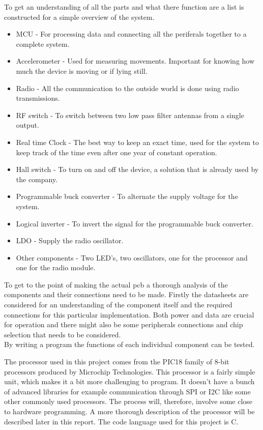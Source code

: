 To get an understanding of all the parts and what there function are a list is constructed for a simple overview of the system.

\begin{itemize}[noitemsep]
	\item MCU - For processing data and connecting all the periferals together to a complete system.
	\item Accelerometer - Used for measuring movements. Important for knowing how much the device is moving or if lying still.
	\item Radio - All the communication to the outside world is done using radio transmissions. 
	\item RF switch - To switch between two low pass filter antennas from a single output.
	\item Real time Clock - The best way to keep an exact time, used for the system to keep track of the time even after one year of constant operation. 
	\item Hall switch - To turn on and off the device, a solution that is already used by the company.
	\item Programmable buck converter - To alternate the supply voltage for the system. 
	\item Logical inverter - To invert the signal for the programmable buck converter.
	\item LDO - Supply the radio oscillator.
	\item Other components - Two LED's, two oscillators, one for the processor and one for the radio module.
\end{itemize}


To get to the point of making the actual \gls{pcb} a thorough analysis of the components and their connections need to be made. Firstly the datasheets are considered for an understanding of the component itself and the required connections for this particular implementation. Both power and data are crucial for operation and there might also be some peripherals connections and chip selection that needs to be considered. \\
By writing a program the functions of each individual component can be tested. 

The processor used in this project comes from the PIC18 family of 8-bit processors produced by Microchip Technologies. This processor is a fairly simple unit, which makes it a bit more challenging to program. It doesn't have a bunch of advanced libraries for example communication through SPI or I2C like some other commonly used processors. The process will, therefore, involve some close to hardware programming. A more thorough description of the processor will be described later in this report. The code language used for this project is C.


